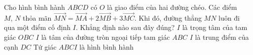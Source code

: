 \begin{ex}%
	Cho hình bình hành $ ABCD$ có $ O$ là giao điểm của hai đường chéo. Các điểm $ M,\,N$ thỏa mãn $\overrightarrow{MN}=\overrightarrow{MA}+2\overrightarrow{MB}+3\overrightarrow{MC}$. Khi đó, đường thẳng $ MN$ luôn đi qua một điểm cố định $ I$. Khẳng định nào sau đây đúng?
	\choice
	{\True $ I$ là trọng tâm của tam giác $ OBC$}
	{$ I$ là tâm của đường tròn ngoại tiếp tam giác $ ABC$}
	{$ I$ là trung điểm của cạnh $ DC$}
	{Tứ giác $ ABCI$ là hình bình hành}
\end{ex}


